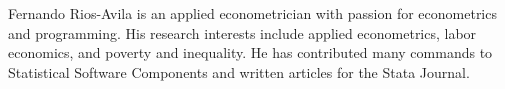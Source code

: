 \documentclass[bib]{statapress}
\begin{document}
\clearpage




\begin{aboutauthors}

Fernando Rios-Avila is an applied econometrician with passion for
econometrics and programming. His research interests include applied
econometrics, labor economics, and poverty and inequality. He has
contributed many commands to Statistical Software Components and written
articles for the Stata Journal.

\end{aboutauthors}
\end{document}
